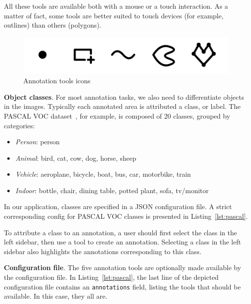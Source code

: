 All these tools are available both with a mouse or a touch interaction.
As a matter of fact, some tools are better suited to touch devices
(for example, outlines) than others (polygons).

\begin{figure}[ht]
\centering
\includegraphics[width=0.8\columnwidth]{assets/img/annotation-tools.png}
\caption{Annotation tools icons}%
\label{fig:icons}
\end{figure}


\textbf{Object classes}.
For most annotation tasks, we also need to differentiate objects in the images.
Typically each annotated area is attributed a class, or label.
The PASCAL VOC dataset~\cite{everingham2010pascal}, for example,
is composed of 20 classes, grouped by categories:
\begin{itemize}
\item \textit{Person}: person
\item \textit{Animal}: bird, cat, cow, dog, horse, sheep
\item \textit{Vehicle}: aeroplane, bicycle, boat, bus, car, motorbike, train
\item \textit{Indoor}: bottle, chair, dining table, potted plant, sofa, tv/monitor
\end{itemize}

In our application, classes are specified in a JSON configuration file.
A strict corresponding config for PASCAL VOC classes
is presented in Listing~\ref{lst:pascal}.



To attribute a class to an annotation,
a user should first select the class in the left sidebar,
then use a tool to create an annotation.
Selecting a class in the left sidebar also highlights the annotations
corresponding to this class.


\textbf{Configuration file}.
The five annotation tools are optionally made available by the configuration file.
In Listing~\ref{lst:pascal}, the last line of the depicted configuration file
contains an \texttt{annotations} field, listing the tools that should be available.
In this case, they all are.

